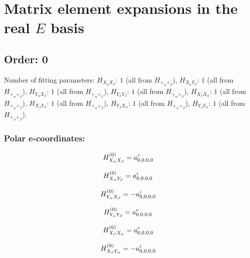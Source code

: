 \documentclass[fleqn]{article}
\begin{document}
\section{Matrix element expansions in the real $E$ basis}
\subsection{Order: 0}
Number of fitting parameters: $H_{X_{\alpha}X_{\beta}}$: $1$ (all from $H_{+_{\alpha}+_{\beta}}$), $H_{X_{\alpha}Y_{\beta}}$: $1$ (all from $H_{+_{\alpha}+_{\beta}}$), $H_{Y_{\alpha}X_{\beta}}$: $1$ (all from $H_{+_{\alpha}+_{\beta}}$), $H_{Y_{\alpha}Y_{\beta}}$: $1$ (all from $H_{+_{\alpha}+_{\beta}}$), $H_{X_{\beta}X_{\alpha}}$: $1$ (all from $H_{+_{\alpha}+_{\beta}}$), $H_{X_{\beta}Y_{\alpha}}$: $1$ (all from $H_{+_{\alpha}+_{\beta}}$), $H_{Y_{\beta}X_{\alpha}}$: $1$ (all from $H_{+_{\alpha}+_{\beta}}$), $H_{Y_{\beta}Y_{\alpha}}$: $1$ (all from $H_{+_{\alpha}+_{\beta}}$).
\subsubsection*{Polar e-coordinates:}

\begin{dmath*}
H_{X_{\alpha}X_{\beta}}^{(0)}=a^{r}_{0,0,0,0}\\
\end{dmath*}

\begin{dmath*}
H_{X_{\alpha}Y_{\beta}}^{(0)}= a^{i}_{0,0,0,0}\\
\end{dmath*}

\begin{dmath*}
H_{Y_{\alpha}X_{\beta}}^{(0)}=-  a^{i}_{0,0,0,0}\\
\end{dmath*}

\begin{dmath*}
H_{Y_{\alpha}Y_{\beta}}^{(0)}= a^{r}_{0,0,0,0}\\
\end{dmath*}

\begin{dmath*}
H_{X_{\beta}X_{\alpha}}^{(0)}=a^{r}_{0,0,0,0}\\
\end{dmath*}

\begin{dmath*}
H_{X_{\beta}Y_{\alpha}}^{(0)}=-  a^{i}_{0,0,0,0}\\
\end{dmath*}
\end{document}
